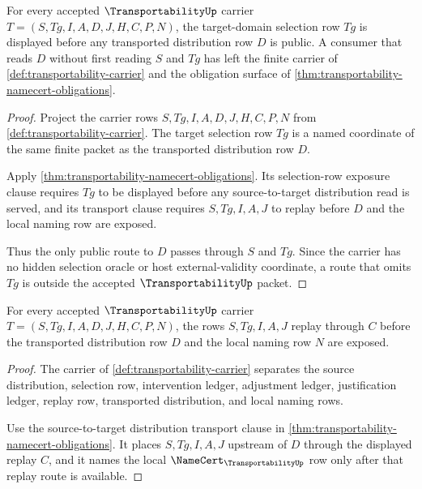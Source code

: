 \begin{theorem}
\label{thm:transportability-selection-row-exposure}
For every accepted $\TransportabilityUp$ carrier $T=(S,Tg,I,A,D,J,H,C,P,N)$, the target-domain selection row $Tg$ is displayed before any transported distribution row $D$ is public. A consumer that reads $D$ without first reading $S$ and $Tg$ has left the finite carrier of \autoref{def:transportability-carrier} and the obligation surface of \autoref{thm:transportability-namecert-obligations}.
\end{theorem}
\begin{proof}
Project the carrier rows $S,Tg,I,A,D,J,H,C,P,N$ from \autoref{def:transportability-carrier}. The target selection row $Tg$ is a named coordinate of the same finite packet as the transported distribution row $D$.

Apply \autoref{thm:transportability-namecert-obligations}. Its selection-row exposure clause requires $Tg$ to be displayed before any source-to-target distribution read is served, and its transport clause requires $S,Tg,I,A,J$ to replay before $D$ and the local naming row are exposed.

Thus the only public route to $D$ passes through $S$ and $Tg$. Since the carrier has no hidden selection oracle or host external-validity coordinate, a route that omits $Tg$ is outside the accepted $\TransportabilityUp$ packet.
\end{proof}

\begin{theorem}
\label{thm:transportability-distribution-transport}
For every accepted $\TransportabilityUp$ carrier $T=(S,Tg,I,A,D,J,H,C,P,N)$, the rows $S,Tg,I,A,J$ replay through $C$ before the transported distribution row $D$ and the local naming row $N$ are exposed.
\end{theorem}
\begin{proof}
The carrier of \autoref{def:transportability-carrier} separates the source distribution, selection row, intervention ledger, adjustment ledger, justification ledger, replay row, transported distribution, and local naming rows.

Use the source-to-target distribution transport clause in \autoref{thm:transportability-namecert-obligations}. It places $S,Tg,I,A,J$ upstream of $D$ through the displayed replay $C$, and it names the local $\NameCert_{\TransportabilityUp}$ row only after that replay route is available.
\end{proof}


